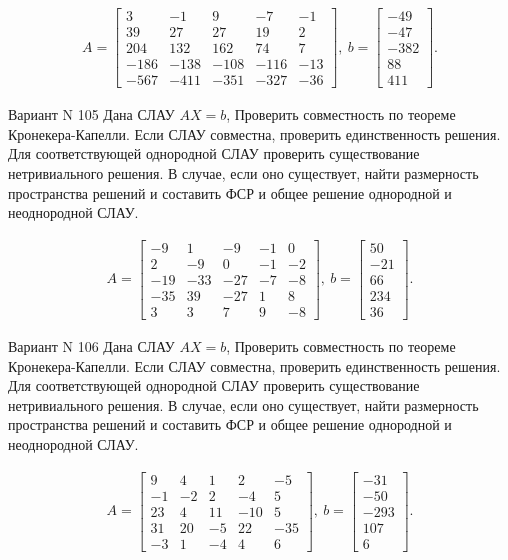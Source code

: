 \documentclass[11pt]{report}
\begin{document}
\begin{align*}
 A = \left[\begin{matrix}3 & -1 & 9 & -7 & -1\\39 & 27 & 27 & 19 & 2\\204 & 132 & 162 & 74 & 7\\-186 & -138 & -108 & -116 & -13\\-567 & -411 & -351 & -327 & -36\end{matrix}\right],
\ b = \left[\begin{matrix}-49\\-47\\-382\\88\\411\end{matrix}\right]. 
 \end{align*}

Вариант N 105
Дана СЛАУ $AX = b$,
Проверить совместность по теореме Кронекера-Капелли. Если СЛАУ совместна, проверить единственность решения.
Для соответствующей однородной СЛАУ проверить существование нетривиального решения. В случае, если оно существует,
найти размерность пространства решений и составить ФСР и общее решение однородной  и неоднородной СЛАУ.


\begin{align*}
 A = \left[\begin{matrix}-9 & 1 & -9 & -1 & 0\\2 & -9 & 0 & -1 & -2\\-19 & -33 & -27 & -7 & -8\\-35 & 39 & -27 & 1 & 8\\3 & 3 & 7 & 9 & -8\end{matrix}\right],
\ b = \left[\begin{matrix}50\\-21\\66\\234\\36\end{matrix}\right]. 
 \end{align*}

Вариант N 106
Дана СЛАУ $AX = b$,
Проверить совместность по теореме Кронекера-Капелли. Если СЛАУ совместна, проверить единственность решения.
Для соответствующей однородной СЛАУ проверить существование нетривиального решения. В случае, если оно существует,
найти размерность пространства решений и составить ФСР и общее решение однородной  и неоднородной СЛАУ.


\begin{align*}
 A = \left[\begin{matrix}9 & 4 & 1 & 2 & -5\\-1 & -2 & 2 & -4 & 5\\23 & 4 & 11 & -10 & 5\\31 & 20 & -5 & 22 & -35\\-3 & 1 & -4 & 4 & 6\end{matrix}\right],
\ b = \left[\begin{matrix}-31\\-50\\-293\\107\\6\end{matrix}\right]. 
 \end{align*}
\end{document}
